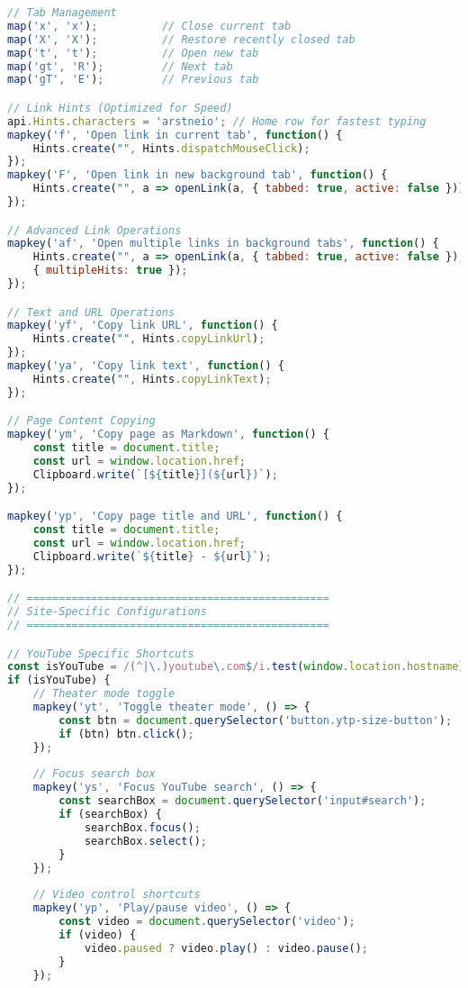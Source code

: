 \documentclass[11pt,a4paper,oneside]{book}
\begin{document}
\begin{codebox}
\begin{lstlisting}[language=JavaScript]
// Tab Management
map('x', 'x');          // Close current tab
map('X', 'X');          // Restore recently closed tab
map('t', 't');          // Open new tab
map('gt', 'R');         // Next tab
map('gT', 'E');         // Previous tab

// Link Hints (Optimized for Speed)
api.Hints.characters = 'arstneio'; // Home row for fastest typing
mapkey('f', 'Open link in current tab', function() { 
    Hints.create("", Hints.dispatchMouseClick); 
});
mapkey('F', 'Open link in new background tab', function() {
    Hints.create("", a => openLink(a, { tabbed: true, active: false }));
});

// Advanced Link Operations
mapkey('af', 'Open multiple links in background tabs', function() {
    Hints.create("", a => openLink(a, { tabbed: true, active: false }), 
    { multipleHits: true });
});

// Text and URL Operations
mapkey('yf', 'Copy link URL', function() { 
    Hints.create("", Hints.copyLinkUrl); 
});
mapkey('ya', 'Copy link text', function() { 
    Hints.create("", Hints.copyLinkText); 
});

// Page Content Copying
mapkey('ym', 'Copy page as Markdown', function() {
    const title = document.title;
    const url = window.location.href;
    Clipboard.write(`[${title}](${url})`);
});

mapkey('yp', 'Copy page title and URL', function() {
    const title = document.title;
    const url = window.location.href;
    Clipboard.write(`${title} - ${url}`);
});

// ===============================================
// Site-Specific Configurations
// ===============================================

// YouTube Specific Shortcuts
const isYouTube = /(^|\.)youtube\.com$/i.test(window.location.hostname);
if (isYouTube) {
    // Theater mode toggle
    mapkey('yt', 'Toggle theater mode', () => {
        const btn = document.querySelector('button.ytp-size-button');
        if (btn) btn.click();
    });
    
    // Focus search box
    mapkey('ys', 'Focus YouTube search', () => {
        const searchBox = document.querySelector('input#search');
        if (searchBox) { 
            searchBox.focus(); 
            searchBox.select(); 
        }
    });
    
    // Video control shortcuts
    mapkey('yp', 'Play/pause video', () => {
        const video = document.querySelector('video');
        if (video) {
            video.paused ? video.play() : video.pause();
        }
    });
    

\end{lstlisting}
\end{codebox}
\end{document}
